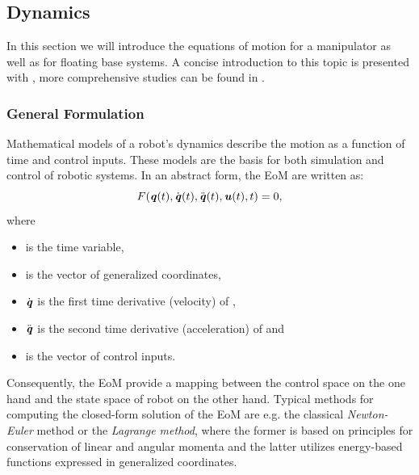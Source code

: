\subsection{Dynamics}
In this section we will introduce the equations of motion for a manipulator as well as for  floating base systems. A concise introduction to this topic is presented with \cite{scaronTeaching}, more comprehensive studies can be found in \cite{roboticSystemsLab2017, featherstone2014rigid}.
\subsubsection{General Formulation}
Mathematical models of a robot's dynamics describe the motion as a function of time and control inputs. These models are the basis for both simulation and control of robotic systems. In an abstract form, the \gls{EoM} are written as: 
\begin{equation} \label{eqn:EoMGeneral}
F(\bm{\mathit{q}}(t),\dot{\bm{\mathit{q}}}(t),\ddot{\bm{\mathit{q}}}(t),\bm{\mathit{u}}(t),t)=0,
\end{equation}
where 
\begin{itemize}
\item {} is the time variable, 
\item {} is the vector of generalized coordinates,
\item $\dot{\bm{\mathit{q}}}$ is the first time derivative (velocity) of , 
\item $\ddot{\bm{\mathit{q}}}$ is the second time derivative (acceleration) of  and
\item {} is the vector of control inputs. 
\end{itemize}
Consequently, the \gls{EoM} provide a mapping between the control space on the one hand and the state space of robot on the other hand. Typical methods for computing the closed-form solution of the \gls{EoM} are e.g. the classical \textit{Newton-Euler} method or the \textit{Lagrange method}, where the former is based on principles for conservation of linear and angular momenta and the latter utilizes energy-based functions expressed in generalized coordinates. 
